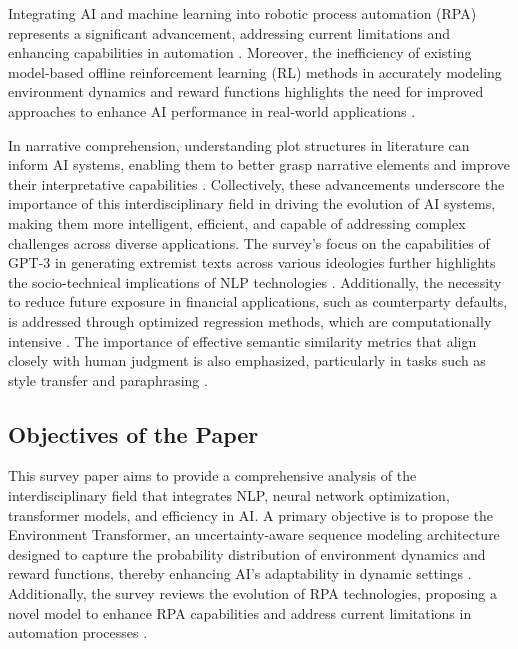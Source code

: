 Integrating AI and machine learning into robotic process automation (RPA) represents a significant advancement, addressing current limitations and enhancing capabilities in automation \cite{pandy2024advancementsroboticsprocessautomation}. Moreover, the inefficiency of existing model-based offline reinforcement learning (RL) methods in accurately modeling environment dynamics and reward functions highlights the need for improved approaches to enhance AI performance in real-world applications \cite{wang2023environmenttransformerpolicyoptimization}.



In narrative comprehension, understanding plot structures in literature can inform AI systems, enabling them to better grasp narrative elements and improve their interpretative capabilities \cite{jannidis2016analyzingfeaturesdetectionhappy}. Collectively, these advancements underscore the importance of this interdisciplinary field in driving the evolution of AI systems, making them more intelligent, efficient, and capable of addressing complex challenges across diverse applications. The survey's focus on the capabilities of GPT-3 in generating extremist texts across various ideologies further highlights the socio-technical implications of NLP technologies \cite{mcguffie2020radicalizationrisksgpt3advanced}. Additionally, the necessity to reduce future exposure in financial applications, such as counterparty defaults, is addressed through optimized regression methods, which are computationally intensive \cite{kun2022mathematicalfoundationsregressionmethods}. The importance of effective semantic similarity metrics that align closely with human judgment is also emphasized, particularly in tasks such as style transfer and paraphrasing \cite{yamshchikov2020styletransferparaphraselookingsensible}.



\subsection{Objectives of the Paper} \label{subsec:Objectives of the Paper}

This survey paper aims to provide a comprehensive analysis of the interdisciplinary field that integrates NLP, neural network optimization, transformer models, and efficiency in AI. A primary objective is to propose the Environment Transformer, an uncertainty-aware sequence modeling architecture designed to capture the probability distribution of environment dynamics and reward functions, thereby enhancing AI's adaptability in dynamic settings \cite{wang2023environmenttransformerpolicyoptimization}. Additionally, the survey reviews the evolution of RPA technologies, proposing a novel model to enhance RPA capabilities and address current limitations in automation processes \cite{pandy2024advancementsroboticsprocessautomation}.



